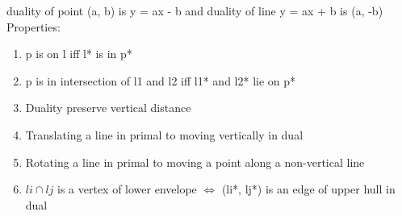 duality of point (a, b) is y = ax - b and duality of line y = ax + b is (a, -b) \\
Properties:
\begin{enumerate}
    \item p is on l iff l* is in p*
    \item p is in intersection of l1 and l2 iff l1* and l2* lie on p*
    \item Duality preserve vertical distance
    \item Translating a line in primal to moving vertically in dual
    \item Rotating a line in primal to moving a point along a non-vertical line
    \item $li \cap lj$ is a vertex of lower envelope $\Longleftrightarrow$ (li*, lj*) is an edge of upper hull in dual
\end{enumerate}
